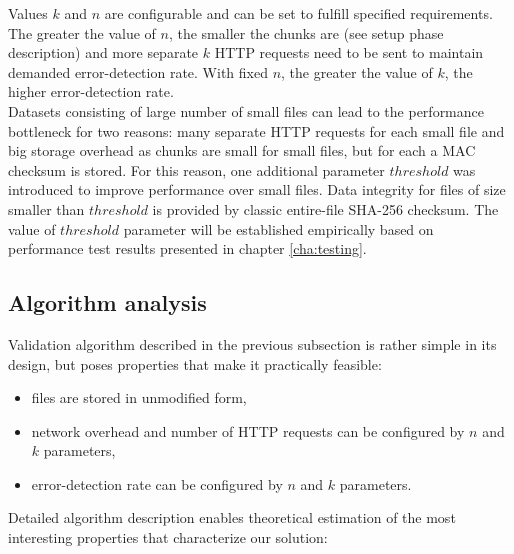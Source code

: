 Values $k$ and $n$ are configurable and can be set to fulfill specified 
requirements. The greater the value of $n$, the smaller the chunks are (see
setup phase description) and more separate $k$ HTTP requests need to be sent to
maintain demanded error-detection rate. With fixed $n$, the greater the value
of $k$, the higher error-detection rate.\\

Datasets consisting of large number of small files can lead to the performance 
bottleneck for two reasons: many separate HTTP requests for each small file and
big storage overhead as chunks are small for small files, but for each a MAC
checksum is stored. For this reason, one additional parameter $threshold$ was 
introduced to improve performance over small files. Data integrity for files
of size smaller than $threshold$ is provided by classic entire-file SHA-256 
checksum. The value of $threshold$ parameter will be established empirically
based on performance test results presented in chapter \ref{cha:testing}.

		\subsection{Algorithm analysis}
Validation algorithm described in the previous subsection is rather simple in 
its design, but poses properties that make it practically feasible:

\begin{itemize}
	\item files are stored in unmodified form,
	\item network overhead and number of HTTP requests can be configured by 
	$n$ and $k$ parameters,
	\item error-detection rate can be configured by $n$ and $k$ parameters.
\end{itemize}

Detailed algorithm description enables theoretical estimation of the most
interesting properties that characterize our solution:

